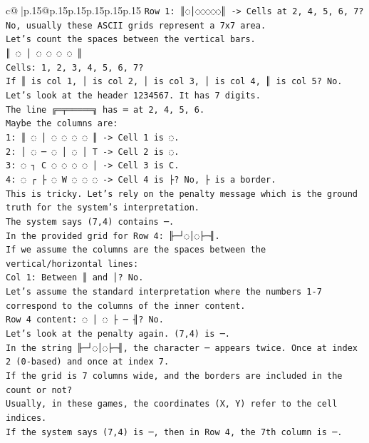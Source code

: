 \documentclass{article}
\begin{document}
{\begin{supertabular}{c@{$\;$}|p{.15\linewidth}@{}p{.15\linewidth}p{.15\linewidth}p{.15\linewidth}p{.15\linewidth}p{.15\linewidth}}
{{{\texttt{Row 1: ║◌│◌◌◌◌◌║ {-}> Cells at 2, 4, 5, 6, 7? No, usually these ASCII grids represent a 7x7 area.} \\
\texttt{Let's count the spaces between the vertical bars.} \\
\texttt{║ ◌ │ ◌ ◌ ◌ ◌ ║} \\
\texttt{Cells: 1, 2, 3, 4, 5, 6, 7?} \\
\texttt{If ║ is col 1, │ is col 2, │ is col 3, │ is col 4, ║ is col 5? No.} \\
\texttt{Let's look at the header  1234567. It has 7 digits.} \\
\texttt{The line ╔═╤═════╗ has ═ at 2, 4, 5, 6.} \\
\texttt{Maybe the columns are:} \\
\texttt{1: ║ ◌ │ ◌ ◌ ◌ ◌ ║ {-}> Cell 1 is ◌.} \\
\texttt{2: │ ◌ ─ ◌ │ ◌ │ T {-}> Cell 2 is ◌.} \\
\texttt{3: ◌ ┐ C ◌ ◌ ◌ ◌ │ {-}> Cell 3 is C.} \\
\texttt{4: ◌ ┌ ├ ◌ W ◌ ◌ ◌ {-}> Cell 4 is ├? No, ├ is a border.} \\
\texttt{This is tricky. Let's rely on the penalty message which is the ground truth for the system's interpretation.} \\
\texttt{The system says (7,4) contains ─.} \\
\texttt{In the provided grid for Row 4: ╟─┘◌│◌├─╢.} \\
\texttt{If we assume the columns are the spaces between the vertical/horizontal lines:} \\
\texttt{Col 1: Between ║ and │? No.} \\
\texttt{Let's assume the standard interpretation where the numbers 1{-}7 correspond to the columns of the inner content.} \\
\texttt{Row 4 content: ◌ │ ◌ ├ ─ ╢? No.} \\
\texttt{Let's look at the penalty again. (7,4) is ─.} \\
\texttt{In the string ╟─┘◌│◌├─╢, the character ─ appears twice. Once at index 2 (0{-}based) and once at index 7.} \\
\texttt{If the grid is 7 columns wide, and the borders are included in the count or not?} \\
\texttt{Usually, in these games, the coordinates (X, Y) refer to the cell indices.} \\
\texttt{If the system says (7,4) is ─, then in Row 4, the 7th column is ─.} \\
}}}
\end{supertabular}}
\end{document}
